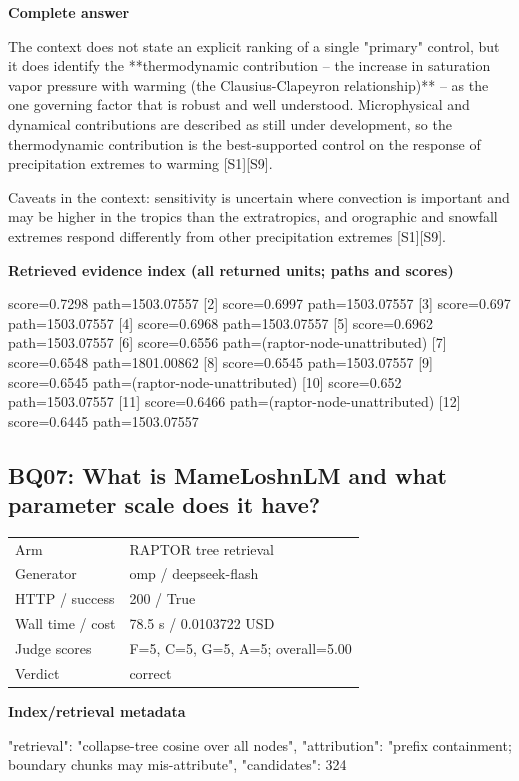 \documentclass[10pt]{article}
\begin{document}
\textbf{Complete answer}
\begin{AnswerText}
The context does not state an explicit ranking of a single "primary" control, but it does identify the **thermodynamic contribution -- the increase in saturation vapor pressure with warming (the Clausius-Clapeyron relationship)** -- as the one governing factor that is robust and well understood. Microphysical and dynamical contributions are described as still under development, so the thermodynamic contribution is the best-supported control on the response of precipitation extremes to warming [S1][S9].

Caveats in the context: sensitivity is uncertain where convection is important and may be higher in the tropics than the extratropics, and orographic and snowfall extremes respond differently from other precipitation extremes [S1][S9].
\end{AnswerText}

\textbf{Retrieved evidence index (all returned units; paths and scores) }
\begin{EvidenceText}
[1] score=0.7298 path=1503.07557
[2] score=0.6997 path=1503.07557
[3] score=0.697 path=1503.07557
[4] score=0.6968 path=1503.07557
[5] score=0.6962 path=1503.07557
[6] score=0.6556 path=(raptor-node-unattributed)
[7] score=0.6548 path=1801.00862
[8] score=0.6545 path=1503.07557
[9] score=0.6545 path=(raptor-node-unattributed)
[10] score=0.652 path=1503.07557
[11] score=0.6466 path=(raptor-node-unattributed)
[12] score=0.6445 path=1503.07557
\end{EvidenceText}
\subsection{BQ07: What is MameLoshnLM and what parameter scale does it have?}
\begin{tabular}{@{}ll@{}}
Arm & RAPTOR tree retrieval\\
Generator & omp / deepseek-flash\\
HTTP / success & 200 / True\\
Wall time / cost & 78.5 s / 0.0103722 USD\\
Judge scores & F=5, C=5, G=5, A=5; overall=5.00\\
Verdict & correct\\
\end{tabular}

\textbf{Index/retrieval metadata}
\begin{EvidenceText}
{
  "retrieval": "collapse-tree cosine over all nodes",
  "attribution": "prefix containment; boundary chunks may mis-attribute",
  "candidates": 324
}
\end{EvidenceText}
\end{document}
